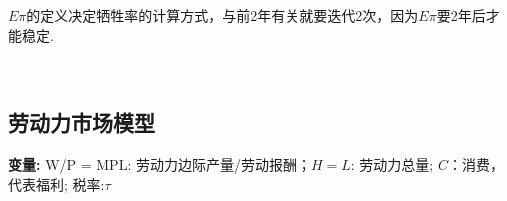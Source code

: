 \documentclass[UTF8, onecolumn, a4paper, 12pt]{article}
\begin{document}
$E\pi$的定义决定牺牲率的计算方式，与前2年有关就要迭代2次，因为$E\pi$要2年后才能稳定.
\begin{center}
	\begin{figure}[htb] %
		\centering %
		\begin{minipage}[b]{0.95\linewidth}
			\
			\hfill
		\end{minipage}
	\end{figure}
\end{center}
\subsection{劳动力市场模型}
\textbf{变量:} W/P = MPL: 劳动力边际产量/劳动报酬；$H=L$: 劳动力总量; $C$：消费，代表福利; 税率:$\tau$
\end{document}
